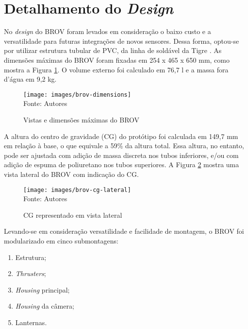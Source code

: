 \section{Detalhamento do \textit{Design}}
\label{sec:detalhamento-design}

No \textit{design} do BROV foram levados em consideração o baixo custo e a versatilidade para futuras integrações de novos sensores. Dessa forma, optou-se por utilizar estrutura tubular de PVC, da linha de soldável da Tigre \cite{Tigre2009}. As dimensões máximas do BROV foram fixadas em 254 x 465 x 650 mm, como mostra a Figura \ref{fig:brov-dimensions}. O volume externo foi calculado em 76,7 l e a massa fora d'água em 9,2 kg.

\begin{figure}[h]
	\centering
	\caption[Vistas e dimensões máximas do BROV]{Vistas e dimensões máximas do BROV}
	\label{fig:brov-dimensions}
	\texttt{[image: images/brov-dimensions]}\\
	\footnotesize Fonte: Autores
\end{figure}

A altura do centro de gravidade (CG) do protótipo foi calculada em 149,7 mm em relação à base, o que equivale a 59\% da altura total. Essa altura, no entanto, pode ser ajustada com adição de massa discreta nos tubos inferiores, e/ou com adição de espuma de poliuretano nos tubos superiores. A Figura \ref{fig:brov-cg-lateral} mostra uma vista lateral do BROV com indicação do CG.

\begin{figure}[h]
	\centering
	\caption[CG representado em vista lateral]{CG representado em vista lateral}
	\label{fig:brov-cg-lateral}
	\texttt{[image: images/brov-cg-lateral]}\\
	\footnotesize Fonte: Autores
\end{figure}

Levando-se em consideração versatilidade e facilidade de montagem, o BROV foi modularizado em cinco submontagens:
\vspace{1ex}
\begin{enumerate}
	\item Estrutura;
	\item \textit{Thrusters};
	\item \textit{Housing} principal;
	\item \textit{Housing} da câmera;
	\item Lanternas.
\end{enumerate}
\vspace{1ex}

